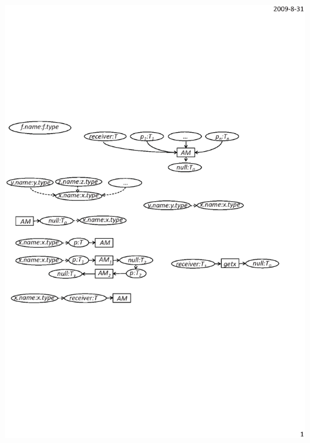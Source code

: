 \begin{enumerate}
\begin{center}
\includegraphics[scale=0.7,clip]{figure/rule8.eps}%
\end{center}\vspace*{-1.5ex}


\end{enumerate}
